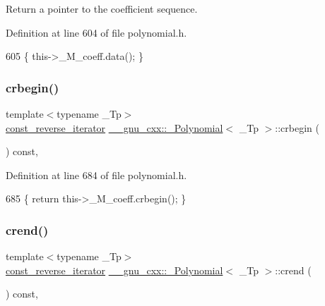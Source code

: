 Return a {\ttfamily pointer} to the coefficient sequence. 

Definition at line 604 of file polynomial.\+h.


\begin{DoxyCode}
605       \{ this->\_M\_coeff.data(); \}
\end{DoxyCode}
\mbox{\label{class____gnu__cxx_1_1__Polynomial_a263b74157472085ae2fb01957a5bda5e}} 
\subsubsection{\texorpdfstring{crbegin()}{crbegin()}}
{\footnotesize\ttfamily template$<$typename \+\_\+\+Tp$>$ \\
\hyperlink{class____gnu__cxx_1_1__Polynomial_a2a042a80127ab9a7b0349a54791e59af}{const\+\_\+reverse\+\_\+iterator} \hyperlink{class____gnu__cxx_1_1__Polynomial}{\+\_\+\+\_\+gnu\+\_\+cxx\+::\+\_\+\+Polynomial}$<$ \+\_\+\+Tp $>$\+::crbegin (\begin{DoxyParamCaption}{ }\end{DoxyParamCaption}) const\hspace{0.3cm}{\ttfamily [inline]}, {\ttfamily [noexcept]}}



Definition at line 684 of file polynomial.\+h.


\begin{DoxyCode}
685       \{ \textcolor{keywordflow}{return} this->\_M\_coeff.crbegin(); \}
\end{DoxyCode}
\mbox{\label{class____gnu__cxx_1_1__Polynomial_a0b314ced62a607798572646a76f2ac35}} 
\subsubsection{\texorpdfstring{crend()}{crend()}}
{\footnotesize\ttfamily template$<$typename \+\_\+\+Tp$>$ \\
\hyperlink{class____gnu__cxx_1_1__Polynomial_a2a042a80127ab9a7b0349a54791e59af}{const\+\_\+reverse\+\_\+iterator} \hyperlink{class____gnu__cxx_1_1__Polynomial}{\+\_\+\+\_\+gnu\+\_\+cxx\+::\+\_\+\+Polynomial}$<$ \+\_\+\+Tp $>$\+::crend (\begin{DoxyParamCaption}{ }\end{DoxyParamCaption}) const\hspace{0.3cm}{\ttfamily [inline]}, {\ttfamily [noexcept]}}



